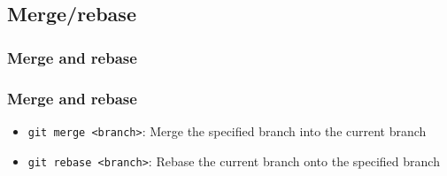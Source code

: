 \documentclass{beamer}
\begin{document}
    \subsection{Merge/rebase}\label{subsec:merge/rebase}
    \begin{frame}
        \frametitle{Merge and rebase}
        \begin{figure}[H]
            \centering
            \noindent
        \end{figure}
    \end{frame}
    \begin{frame}
        \frametitle{Merge and rebase}
        \begin{itemize}
            \item \texttt{git merge <branch>}: Merge the specified branch into the current branch
            \item \texttt{git rebase <branch>}: Rebase the current branch onto the specified branch
        \end{itemize}
    \end{frame}
\end{document}
